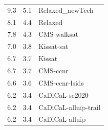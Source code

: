 \documentclass{elsarticle}
\begin{document}
\begin{table}
\begin{center}
\begin{tabular}{ccl}
\hline
9.3 & 5.1 & Relaxed\_newTech \\
8.1 & 4.4 & Relaxed \\
7.8 & 4.3 & CMS-walksat \\
7.0 & 3.8 & Kissat-sat \\
6.7 & 3.7 & Kissat \\
6.7 & 3.7 & CMS-ccnr \\
6.6 & 3.6 & CMS-ccnr-lsids \\
6.2 & 3.4 & CaDiCaL-sc2020 \\
6.2 & 3.4 & CaDiCaL-alluip-trail \\
6.2 & 3.4 & CaDiCaL-alluip \\
\end{tabular}
\end{center}
\end{table}
\end{document}
